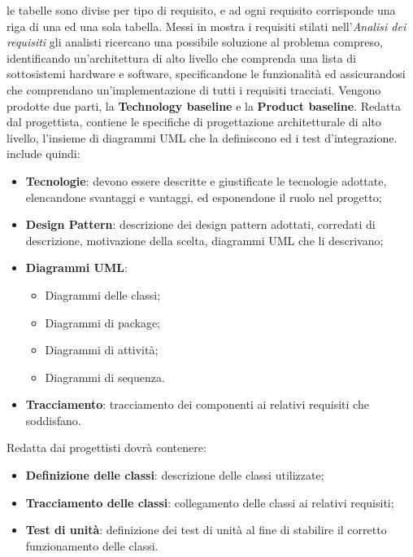 	    le tabelle sono divise per tipo di requisito, e ad ogni requisito corrisponde una riga di una ed una sola tabella.
		Messi in mostra i requisiti stilati nell'\textit{Analisi dei requisiti} gli analisti ricercano una possibile soluzione al problema compreso, identificando un'architettura di alto livello che comprenda una lista di sottosistemi hardware e software, specificandone le funzionalità ed assicurandosi che comprendano un'implementazione di tutti i requisiti tracciati.
		Vengono prodotte due parti, la \textbf{Technology baseline} e la \textbf{Product baseline}.
		Redatta dal progettista, contiene le specifiche di progettazione architetturale di alto livello, l'insieme di diagrammi UML che la definiscono ed i test d'integrazione.\newline
		include quindi:
		\begin{itemize}
		    \item \textbf{Tecnologie}: devono essere descritte e giustificate le tecnologie adottate, elencandone svantaggi e vantaggi, ed esponendone il ruolo nel progetto;
		    \item \textbf{Design Pattern}: descrizione dei design pattern adottati, corredati di descrizione, motivazione della scelta, diagrammi UML che li descrivano;
		    \item \textbf{Diagrammi UML}:
		    \begin{itemize}
		        \item Diagrammi delle classi;
		        \item Diagrammi di package;
		        
		        \item Diagrammi di attività;
		        \item Diagrammi di sequenza.
		    \end{itemize}
		    \item \textbf{Tracciamento}: tracciamento dei componenti ai relativi requisiti che soddisfano.
		\end{itemize}
		Redatta dai progettisti dovrà contenere:
		\begin{itemize}
		    \item \textbf{Definizione delle classi}: descrizione delle classi utilizzate;
		    \item \textbf{Tracciamento delle classi}: collegamento delle classi ai relativi requisiti;
		    \item \textbf{Test di unità}: definizione dei test di unità al fine di stabilire il corretto funzionamento delle classi.
		\end{itemize}

